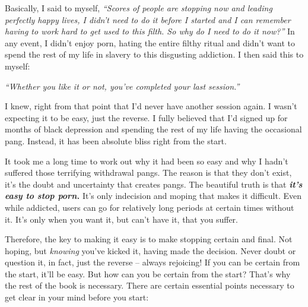 \documentclass[
]{book}
\begin{document}
Basically, I said to myself, \emph{``Scores of people are stopping now and leading perfectly happy lives, I didn't need to do it before I started and I can remember having to work hard to get used to this filth. So why do I need to do it now?''} In any event, I didn't enjoy porn, hating the entire filthy ritual and didn't want to spend the rest of my life in slavery to this disgusting addiction. I then said this to myself:

\emph{``Whether you like it or not, you've completed your last session.''}

I knew, right from that point that I'd never have another session again. I wasn't expecting it to be easy, just the reverse. I fully believed that I'd signed up for months of black depression and spending the rest of my life having the occasional pang. Instead, it has been absolute bliss right from the start.

It took me a long time to work out why it had been so easy and why I hadn't suffered those terrifying withdrawal pangs. The reason is that they don't exist, it's the doubt and uncertainty that creates pangs. The beautiful truth is that \textbf{\emph{it's easy to stop porn.}} It's only indecision and moping that makes it difficult. Even while addicted, users can go for relatively long periods at certain times without it. It's only when you want it, but can't have it, that you suffer.

Therefore, the key to making it easy is to make stopping certain and final. Not hoping, but \emph{knowing} you've kicked it, having made the decision. Never doubt or question it, in fact, just the reverse -- always rejoicing! If you can be certain from the start, it'll be easy. But how can you be certain from the start? That's why the rest of the book is necessary. There are certain essential points necessary to get clear in your mind before you start:
\end{document}
